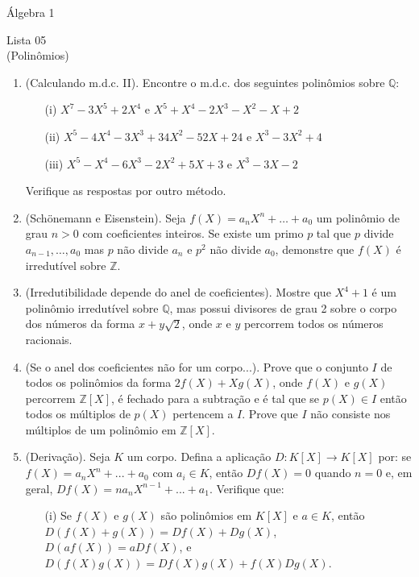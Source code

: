 \documentclass[a4paper,12pt]{article}
\begin{document}
\begin{center}
    Álgebra 1 
\end{center}

\begin{center}
    \large Lista 05 \\
    \small (Polinômios)
\end{center}

\begin{enumerate}[label=5.\arabic*.]
\item (Calculando m.d.c. II). Encontre o m.d.c. dos seguintes polinômios sobre $\mathbb{Q}$:
    \begin{itemize}
        \item[(i)] $X^7 - 3X^5 + 2X^4$ e $X^5 + X^4 - 2X^3 - X^2 - X + 2$
        \item[(ii)] $X^5 - 4X^4 - 3X^3 + 34X^2 - 52X + 24$ e $X^3 - 3X^2 + 4$
        \item[(iii)] $X^5 - X^4 - 6X^3 -2X^2 + 5X + 3$ e $X^3 - 3X - 2$
    \end{itemize}
    Verifique as respostas por outro método.
    \item (Schönemann e Eisenstein). Seja $f(X) = a_n X^n + \dots + a_0$ um polinômio de grau $n > 0$ com coeficientes inteiros. Se existe um primo $p$ tal que $p$ divide $a_{n-1},\ldots,a_0$ mas $p$ não divide $a_n$ e $p^2$ não divide $a_0$, demonstre que $f(X)$ é irredutível sobre $\mathbb{Z}$.
    \item (Irredutibilidade depende do anel de coeficientes). Mostre que $X^4 + 1$ é um polinômio irredutível sobre $\mathbb{Q}$, mas possui divisores de grau 2 sobre o corpo dos números da forma $x + y \sqrt{2}$, onde $x$ e $y$ percorrem todos os números racionais.
    \item (Se o anel dos coeficientes não for um corpo...). Prove que o conjunto $I$ de todos os polinômios da forma $2f(X) + Xg(X)$, onde $f(X)$ e $g(X)$ percorrem $\mathbb{Z}[X]$, é fechado para a subtração e é tal que se $p(X) \in I$ então todos os múltiplos de $p(X)$ pertencem a $I$. Prove que $I$ não consiste nos múltiplos de um polinômio em $\mathbb{Z}[X]$.
    \item (Derivação). Seja $K$ um corpo. Defina a aplicação $D: K[X] \to K[X]$ por: se $f(X) = a_n X^n + ... + a_0$ com $a_i \in K$, então $Df(X) = 0$ quando $n = 0$ e, em geral, $Df(X) = n a_n X^{n-1} + ... + a_1$. Verifique que:
    \begin{enumerate}
        \item[(i)] Se $f(X)$ e $g(X)$ são polinômios em $K[X]$ e $a \in K$, então $D(f(X) + g(X)) = Df(X) + Dg(X)$, $D(a f(X)) = a Df(X)$, e $D(f(X) g(X)) = Df(X) g(X) + f(X) Dg(X)$.

\end{enumerate}
\end{enumerate}
\end{document}
